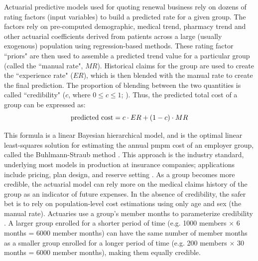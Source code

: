 \documentclass[letterpaper]{article} %
\begin{document}
Actuarial predictive models used for quoting renewal business rely on dozens of rating factors (input variables) to build a predicted rate for a given group.  The factors rely on pre-computed demographic, medical trend, pharmacy trend and other actuarial coefficients derived from patients across a large (usually exogenous) population using regression-based methods. These rating factor ``priors" are then used to assemble a predicted trend value for a particular group (called the ``manual rate", $MR$).  Historical claims for the group are used to create the ``experience rate" ($ER$), which is then blended with the manual rate to create the final prediction. The proportion of blending between the two quantities is called ``credibility" ($c$, where $0 \leq c \leq 1$; \citeauthor{buhlcred} \citeyear{buhlcred}). Thus, the predicted total cost of a group can be expressed as:
\begin{equation}   
{\rm predicted~cost} = c \cdot ER + (1 - c)  \cdot MR
 \label{eq:eq1}
\end{equation}

This formula is a linear Bayesian hierarchical model, and is the optimal linear least-squares solution for estimating the annual pmpm cost of an employer group, called the Buhlmann-Straub method \cite{LecNoteCred}. This approach is the industry standard, underlying most models in production at insurance companies; applications include pricing, plan design, and reserve setting \cite{GrpInsur, CredGrpMed}. As a group becomes more credible, the actuarial model can rely more on the medical claims history of the group as an indicator of future expenses. In the absence of credibility, the safer bet is to rely on population-level cost estimations using only age and sex (the manual rate). Actuaries use a group's member months to parameterize credibility \cite{buhlcred, CMSCred}.  A larger group enrolled for a shorter period of time (e.g. 1000 members $\times$ 6 months = 6000 member months) can have the same number of member months as a smaller group enrolled for a longer period of time (e.g. 200 members $\times$ 30 months = 6000 member months), making them equally credible.
\end{document}
